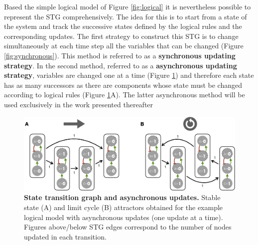 \documentclass[a4paper,12pt,twoside,onecolumn,openright,final,oldfontcommands]{memoir}
\begin{document}
Based the simple logical model of Figure \ref{fig:logical} it is
nevertheless possible to represent the STG comprehensively. The idea for
this is to start from a state of the system and track the successive
states defined by the logical rules and the corresponding updates. The
first strategy to construct this STG is to change simultaneously at each
time step all the variables that can be changed (Figure
\ref{fig:synchronous}). This method is referred to as a
\textbf{synchronous updating strategy}. In the second method, referred
to as a \textbf{asynchronous updating strategy}, variables are changed
one at a time (Figure \ref{fig:asynchronous}) and therefore each state
has as many successors as there are components whose state must be
changed according to logical rules (Figure \ref{fig:asynchronous}A). The
latter asynchronous method will be used exclusively in the work
presented thereafter

\begin{figure}

{\centering \includegraphics[width=0.9\linewidth]{fig/asynchronous} 

}

\caption[A simple example of a logical model]{\textbf{State transition graph and
asynchronous updates.} Stable state (A) and limit cycle (B) attractors
obtained for the example logical model with asynchronous updates (one
update at a time). Figures above/below STG edges correspond to the
number of nodes updated in each transition.}\label{fig:asynchronous}
\end{figure}
\end{document}
